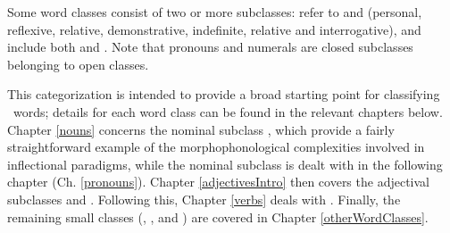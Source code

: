Some word classes consist of two or more subclasses: %
 refer to  %
and  (personal, reflexive, relative, demonstrative, indefinite, relative and interrogative), and  include both  and . %
Note that pronouns and numerals are closed subclasses belonging to open classes.

This categorization is intended to provide a broad starting point for classifying \PS\ words; details for each word class can be found in the relevant chapters below. 
Chapter \ref{nouns} concerns the nominal subclass , which provide a fairly straightforward example of the morphophonological complexities involved in inflectional paradigms, while 
the nominal subclass  is dealt with in the following chapter (Ch. \ref{pronouns}). %
Chapter \ref{adjectivesIntro} then covers the adjectival subclasses  and . Following this, Chapter \ref{verbs} deals with . Finally, the remaining small classes (, ,  %
and ) are covered in Chapter \ref{otherWordClasses}. 

